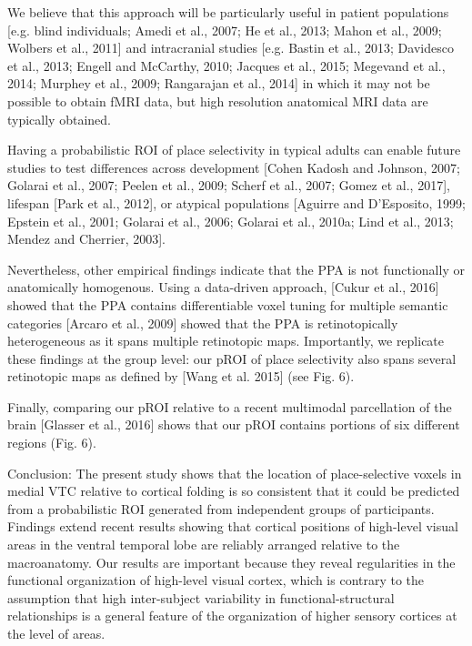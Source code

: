 %
We believe that this approach will be particularly useful in patient populations
[e.g. blind individuals; Amedi et al., 2007; He et al., 2013; Mahon et al.,
2009; Wolbers et al., 2011] and intracranial studies [e.g. Bastin et al., 2013;
Davidesco et al., 2013; Engell and McCarthy, 2010; Jacques et al., 2015;
Megevand et al., 2014; Murphey et al., 2009; Rangarajan et al., 2014] in which
it may not be possible to obtain fMRI data, but high resolution anatomical MRI
data are typically obtained.

%
Having a probabilistic ROI of place selectivity in typical adults
can enable future studies to test differences across development [Cohen Kadosh
and Johnson, 2007; Golarai et al., 2007; Peelen et al., 2009; Scherf et al.,
2007; Gomez et al., 2017], lifespan [Park et al., 2012], or atypical populations
[Aguirre and D'Esposito, 1999; Epstein et al., 2001; Golarai et al., 2006;
Golarai et al., 2010a; Lind et al., 2013; Mendez and Cherrier, 2003].

%
Nevertheless, other empirical findings indicate that the PPA is not functionally
or anatomically homogenous.
%
Using a data-driven approach, [Cukur et al., 2016] showed that the PPA contains
differentiable voxel tuning for multiple semantic categories
%
[Arcaro et al., 2009] showed that the PPA is retinotopically heterogeneous as it
spans multiple retinotopic maps.
%
Importantly, we replicate these findings at the group level: our pROI of place
selectivity also spans several retinotopic maps as defined by [Wang et al. 2015]
(see Fig. 6).

%
Finally, comparing our pROI relative to a recent multimodal parcellation of the
brain [Glasser et al., 2016] shows that our pROI contains portions of six
different regions (Fig. 6).
%

Conclusion:
%
The present study shows that the location of place-selective voxels in medial
VTC relative to cortical folding is so consistent that it could be predicted
from a probabilistic ROI generated from independent groups of participants.
%
Findings extend recent results showing that cortical positions of
high-level visual areas in the ventral temporal lobe are reliably arranged
relative to the macroanatomy.
%
Our results are important because they reveal regularities in the functional
organization of high-level visual cortex, which is contrary to the assumption
that high inter-subject variability in functional-structural relationships is a
general feature of the organization of higher sensory cortices at the level of
areas.


